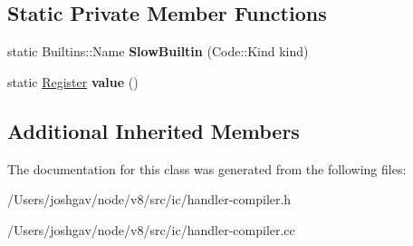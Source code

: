\subsection*{Static Private Member Functions}
\begin{DoxyCompactItemize}
\item 
static Builtins\+::\+Name {\bfseries Slow\+Builtin} (Code\+::\+Kind kind)\hypertarget{classv8_1_1internal_1_1_named_store_handler_compiler_a89eec5ce4332a3a1b616e61f7e6e659d}{}\label{classv8_1_1internal_1_1_named_store_handler_compiler_a89eec5ce4332a3a1b616e61f7e6e659d}

\item 
static \hyperlink{structv8_1_1internal_1_1_register}{Register} {\bfseries value} ()\hypertarget{classv8_1_1internal_1_1_named_store_handler_compiler_ac28c5fbf1e80e081aa168fb61b2cfba4}{}\label{classv8_1_1internal_1_1_named_store_handler_compiler_ac28c5fbf1e80e081aa168fb61b2cfba4}

\end{DoxyCompactItemize}
\subsection*{Additional Inherited Members}


The documentation for this class was generated from the following files\+:\begin{DoxyCompactItemize}
\item 
/\+Users/joshgav/node/v8/src/ic/handler-\/compiler.\+h\item 
/\+Users/joshgav/node/v8/src/ic/handler-\/compiler.\+cc\end{DoxyCompactItemize}
